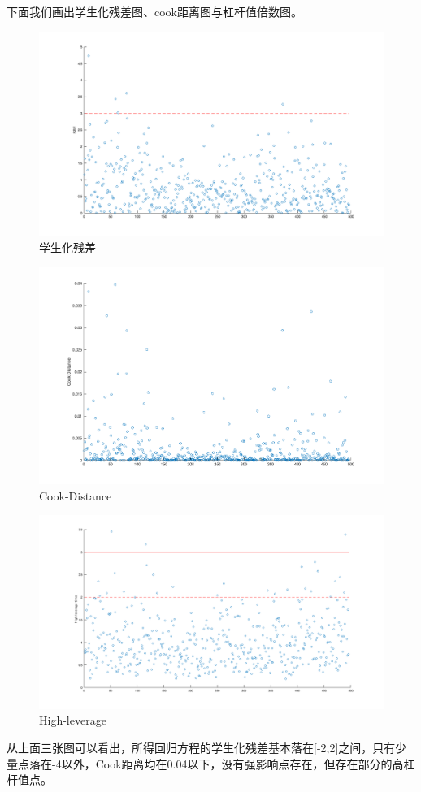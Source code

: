 \documentclass[11pt]{article}
\begin{document}
下面我们画出学生化残差图、cook距离图与杠杆值倍数图。
\begin{figure}[H]
\centering
\caption{学生化残差}
\includegraphics[scale=0.33]{images/stu_res.png}
\end{figure}
\begin{figure}[H]
\centering
\caption{Cook-Distance}
\includegraphics[scale=0.35]{images/cook.png}
\end{figure}
\begin{figure}[H]
	\centering
	\caption{High-leverage}
	\includegraphics[scale=0.31]{images/hlt.png}
\end{figure}
从上面三张图可以看出，所得回归方程的学生化残差基本落在[-2,2]之间，只有少量点落在-4以外，Cook距离均在0.04以下，没有强影响点存在，但存在部分的高杠杆值点。
\end{document}

